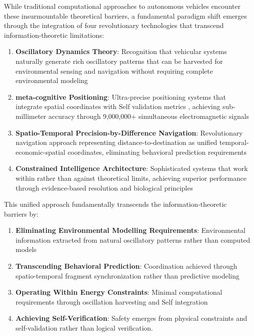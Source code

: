 \documentclass[12pt,a4paper]{article}
\begin{document}
While traditional computational approaches to autonomous vehicles encounter these insurmountable theoretical barriers, a fundamental paradigm shift emerges through the integration of four revolutionary technologies that transcend information-theoretic limitations:

\begin{enumerate}
\item \textbf{Oscillatory Dynamics Theory}: Recognition that vehicular systems naturally generate rich oscillatory patterns that can be harvested for environmental sensing and navigation without requiring complete environmental modeling
\item \textbf{meta-cognitive Positioning}: Ultra-precise positioning systems that integrate spatial coordinates with Self validation metrics \cite{tononi2008,dehaene2014}, achieving sub-millimeter accuracy through 9,000,000+ simultaneous electromagnetic signals
\item \textbf{Spatio-Temporal Precision-by-Difference Navigation}: Revolutionary navigation approach representing distance-to-destination as unified temporal-economic-spatial coordinates, eliminating behavioral prediction requirements
\item \textbf{Constrained Intelligence Architecture}: Sophisticated systems that work within rather than against theoretical limits, achieving superior performance through evidence-based resolution and biological principles
\end{enumerate}

This unified approach fundamentally transcends the information-theoretic barriers by:

\begin{enumerate}
\item \textbf{Eliminating Environmental Modelling Requirements}: Environmental information extracted from natural oscillatory patterns rather than computed models
\item \textbf{Transcending Behavioral Prediction}: Coordination achieved through spatio-temporal fragment synchronization rather than predictive modeling
\item \textbf{Operating Within Energy Constraints}: Minimal computational requirements through oscillation harvesting and Self integration
\item \textbf{Achieving Self-Verification}: Safety emerges from physical constraints and self-validation rather than logical verification.
\end{enumerate}
\end{document}
